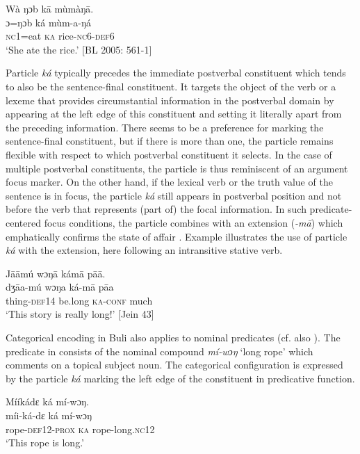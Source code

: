 \documentclass[output=paper]{langsci/langscibook}
\begin{document}
\ea
\glll \textup{}  Wà ŋɔb  k\={a}  mùmàŋ\={a}.\\
  \textup{ɔ=ŋɔb    ká  mùm-a-ŋá}\\
     \textsc{nc1}=eat  \textsc{ka}  rice-\textsc{nc}6-\textsc{def}6\\
\glt ‘She ate the rice.’ [BL  2005: 561-1]
\z

Particle \textit{ká} typically precedes the immediate postverbal constituent which tends to also be the sentence-final constituent. It targets the object of the verb or a lexeme that provides circumstantial information in the postverbal domain by appearing at the left edge of this constituent and setting it literally apart from the preceding information. There seems to be a preference for marking the sentence-final constituent, but if there is more than one, the particle remains flexible with respect to which postverbal constituent it selects. In the case of multiple postverbal constituents, the particle is thus reminiscent of an argument focus marker. On the other hand, if the lexical verb or the truth value of the sentence is in focus, the particle \textit{ká} still appears in postverbal position and not before the verb that represents (part of) the focal information. In such predicate-centered focus conditions, the particle combines with an extension (\textit{-m\={a}}) which emphatically confirms the state of affair \citep{Schwarz2010b}. Example  illustrates the use of particle \textit{ká} with the extension, here following an intransitive stative verb.

\ea
\glll \textup{}  J\={a}\={a}mú    wɔŋ\={a}    kám\={a}    p\={a}\={a}.\\
  \textup{dʒ\={a}a-mú  wɔŋa    ká-m\={a}    p\={a}a}\\
     thing-\textsc{def}14  be.long  \textsc{ka}-\textsc{conf}  much\\
\glt ‘This story is really long!’ [Jein 43]
\z

Categorical encoding in Buli also applies to nominal predicates (cf. also \citealt{Schwarz2009}). The predicate in  consists of the nominal compound \textit{mí-wɔŋ}\textit{}‘long rope’ which comments on a topical subject noun. The categorical configuration is expressed by the particle \textit{ká} marking the left edge of the constituent in predicative function. 

\ea
\glll \textup{ } Mííkádɛ    ká  mí-wɔŋ.\\
  \textup{  míi-ká-dɛ    ká  mí-wɔŋ}\\
       rope-\textsc{def}12-\textsc{prox}  \textsc{ka}  rope-long.\textsc{nc}12\\
\glt ‘This rope is long.’ \citep[267]{Schwarz2009}
\z
\end{document}
